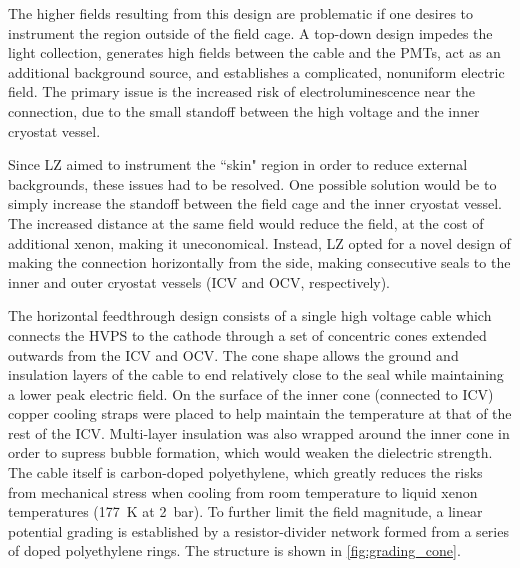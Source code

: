 The higher fields resulting from this design are problematic if one desires to instrument the region outside of the field cage.
A top-down design impedes the light collection, generates high fields between the cable and the PMTs, act as an additional background source, and establishes a complicated, nonuniform electric field.
The primary issue is the increased risk of electroluminescence near the connection, due to the small standoff between the high voltage and the inner cryostat vessel.

Since LZ aimed to instrument the ``skin" region in order to reduce external backgrounds, these issues had to be resolved.
One possible solution would be to simply increase the standoff between the field cage and the inner cryostat vessel. 
The increased distance at the same field would reduce the field, at the cost of additional xenon, making it uneconomical.
Instead, LZ opted for a novel design of making the connection horizontally from the side, making consecutive seals to the inner and outer cryostat vessels (ICV and OCV, respectively).

The horizontal feedthrough design consists of a single high voltage cable which connects the HVPS to the cathode through a set of concentric cones extended outwards from the ICV and OCV.
The cone shape allows the ground and insulation layers of the cable to end relatively close to the seal while maintaining a lower peak electric field.
On the surface of the inner cone (connected to ICV) copper cooling straps were placed to help maintain the temperature at that of the rest of the ICV.
Multi-layer insulation was also wrapped around the inner cone in order to supress bubble formation, which would weaken the dielectric strength.
The cable itself is carbon-doped polyethylene, which greatly reduces the risks from mechanical stress when cooling from room temperature to liquid xenon temperatures (177~K at 2~bar).
To further limit the field magnitude, a linear potential grading is established by a resistor-divider network formed from a series of doped polyethylene rings.
The structure is shown in \ref{fig:grading_cone}.


